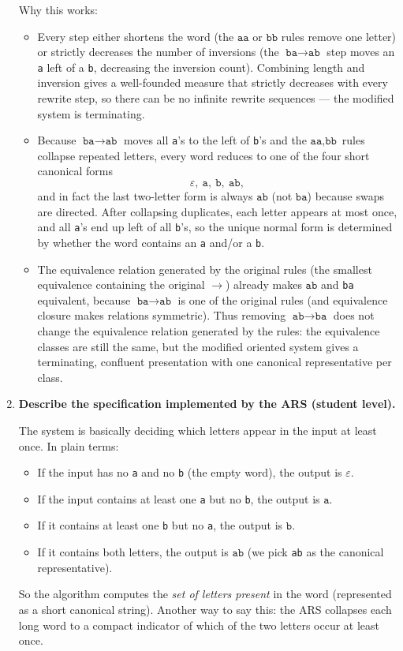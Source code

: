 \documentclass[12pt]{article}
\begin{document}
\begin{enumerate}[label=(\alph*)]
  Why this works:
  \begin{itemize}
    \item Every step either shortens the word (the \(\texttt{aa}\) or \(\texttt{bb}\) rules remove one letter) or strictly decreases the number of inversions (the \(\texttt{ba}\to\texttt{ab}\) step moves an \texttt{a} left of a \texttt{b}, decreasing the inversion count). Combining length and inversion gives a well-founded measure that strictly decreases with every rewrite step, so there can be no infinite rewrite sequences — the modified system is terminating.
    \item Because \(\texttt{ba}\to\texttt{ab}\) moves all \texttt{a}'s to the left of \texttt{b}'s and the \(\texttt{aa},\texttt{bb}\) rules collapse repeated letters, every word reduces to one of the four short canonical forms
    \[
      \varepsilon,\ \texttt{a},\ \texttt{b},\ \texttt{ab},
    \]
    and in fact the last two-letter form is always \(\texttt{ab}\) (not \(\texttt{ba}\)) because swaps are directed. After collapsing duplicates, each letter appears at most once, and all \texttt{a}'s end up left of all \texttt{b}'s, so the unique normal form is determined by whether the word contains an \texttt{a} and/or a \texttt{b}.
    \item The equivalence relation generated by the original rules (the smallest equivalence containing the original \(\to\)) already makes \(\texttt{ab}\) and \texttt{ba} equivalent, because \(\texttt{ba}\to\texttt{ab}\) is one of the original rules (and equivalence closure makes relations symmetric). Thus removing \(\texttt{ab}\to\texttt{ba}\) does not change the equivalence relation generated by the rules: the equivalence classes are still the same, but the modified oriented system gives a terminating, confluent presentation with one canonical representative per class.
  \end{itemize}
  
  \item \textbf{Describe the specification implemented by the ARS (student level).}
  
  The system is basically deciding which letters appear in the input at least once. In plain terms:
  \begin{itemize}
    \item If the input has no \texttt{a} and no \texttt{b} (the empty word), the output is \(\varepsilon\).
    \item If the input contains at least one \texttt{a} but no \texttt{b}, the output is \(\texttt{a}\).
    \item If it contains at least one \texttt{b} but no \texttt{a}, the output is \(\texttt{b}\).
    \item If it contains both letters, the output is \(\texttt{ab}\) (we pick \texttt{ab} as the canonical representative).
  \end{itemize}
  So the algorithm computes the \emph{set of letters present} in the word (represented as a short canonical string). Another way to say this: the ARS collapses each long word to a compact indicator of which of the two letters occur at least once.
\end{enumerate}
\end{document}
